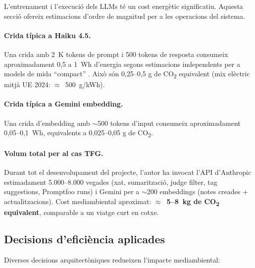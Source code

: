 L'entrenament i l'execució dels LLMs té un cost energètic significatiu. Aquesta secció ofereix estimacions d'ordre de magnitud per a les operacions del sistema.

\paragraph{Crida típica a Haiku 4.5.} Una crida amb 2~K tokens de prompt i 500 tokens de resposta consumeix aproximadament 0{,}5 a 1~Wh d'energia segons estimacions independents per a models de mida ``compact'' \parencite{patterson2021carbon}. Això són 0{,}25--0{,}5 g de CO\textsubscript{2} equivalent (mix elèctric mitjà UE 2024: $\approx$~500~g/kWh).

\paragraph{Crida típica a Gemini embedding.} Una crida d'embedding amb $\sim$500 tokens d'input consumeix aproximadament 0{,}05--0{,}1~Wh, equivalents a 0{,}025--0{,}05 g de CO\textsubscript{2}.

\paragraph{Volum total per al cas TFG.} Durant tot el desenvolupament del projecte, l'autor ha invocat l'API d'Anthropic estimadament 5.000--8.000 vegades (xat, sumarització, judge filter, tag suggestions, Promptfoo runs) i Gemini per a $\sim$200 embeddings (notes creades + actualitzacions). Cost mediambiental aproximat: \textbf{$\approx$~5--8~kg de CO\textsubscript{2} equivalent}, comparable a un viatge curt en cotxe.

\subsection{Decisions d'eficiència aplicades}

Diverses decisions arquitectòniques redueixen l'impacte mediambiental:

